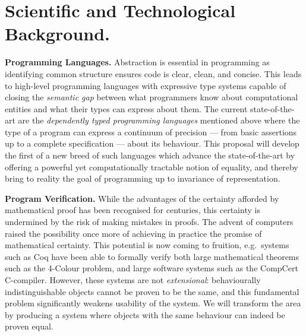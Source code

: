 \documentclass[a4paper,11pt]{article}
\newcommand{\eg}{{e.g.}\ }
\begin{document}

\vspace*{-0.1in} 
\section{Scientific and Technological Background.}
\vspace*{-0.1in} 

{\bf Programming Languages.} Abstraction is essential in programming
as identifying common structure ensures code is clear,
clean, and concise. This leads to high-level
programming languages with expressive type systems capable of closing
the {\em semantic gap} between what programmers know about
computational entities and what their types can express about them.
The current state-of-the-art are the {\em dependently typed
  programming languages} mentioned above where
the type of a program can express a
continuum of precision --- from basic assertions up to a complete
specification --- about its behaviour. This proposal will
develop the first of a new breed of 
such languages which advance the state-of-the-art by offering a
powerful yet computationally tractable notion of equality, and thereby bring to
reality the goal of programming up to invariance of representation.



{\bf Program Verification.} While the advantages of the certainty
afforded by mathematical proof has been recognised for centuries, this
certainty is undermined by the risk of making mistakes in
proofs. The advent of computers raised the possibility once more of
achieving in practice the promise of mathematical certainty. This
potential is now coming to fruition, \eg systems such as Coq have been
able to formally verify both large mathematical theorems such as the
4-Colour problem, and large software systems such as the CompCert
C-compiler. However, these systems are not {\em extensional}:
behaviourally indistinguishable objects cannot be proven to be the
same, and this fundamental problem significantly weakens usability of the
system. We will transform the area by producing a system where
objects with the same behaviour can indeed be proven equal.
\end{document}
